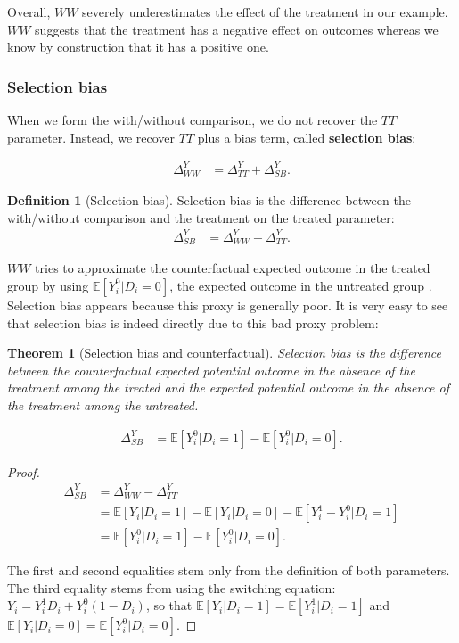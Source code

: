 \documentclass[
]{book}
\newcommand{\esp}[1]{\mathbb{E}[ #1 ]}
\newtheorem{theorem}{Theorem}[chapter]
\theoremstyle{definition}
\newtheorem{definition}{Definition}[chapter]
\theoremstyle{definition}
\theoremstyle{definition}
\theoremstyle{definition}
\theoremstyle{remark}
\begin{document}
Overall, \(WW\) severely underestimates the effect of the treatment in our example.
\(WW\) suggests that the treatment has a negative effect on outcomes whereas we know by construction that it has a positive one.

\hypertarget{selection-bias}{%
\subsubsection{Selection bias}\label{selection-bias}}

When we form the with/without comparison, we do not recover the \(TT\) parameter.
Instead, we recover \(TT\) plus a bias term, called \textbf{selection bias}:

\begin{align*}
\Delta^Y_{WW} & =\Delta^Y_{TT}+\Delta^Y_{SB}.
\end{align*}

\begin{definition}[Selection bias]
\protect\hypertarget{def:SB}{}{\label{def:SB} \iffalse (Selection bias) \fi{} }Selection bias is the difference between the with/without comparison and the treatment on the treated parameter:
\begin{align*}
\Delta^Y_{SB} & = \Delta^Y_{WW}-\Delta^Y_{TT}.
\end{align*}
\end{definition}

\(WW\) tries to approximate the counterfactual expected outcome in the treated group by using \(\esp{Y_i^0|D_i=0}\), the expected outcome in the untreated group .
Selection bias appears because this proxy is generally poor.
It is very easy to see that selection bias is indeed directly due to this bad proxy problem:

\begin{theorem}[Selection bias and counterfactual]
\protect\hypertarget{thm:SBth}{}{\label{thm:SBth} \iffalse (Selection bias and counterfactual) \fi{} }Selection bias is the difference between the counterfactual expected potential outcome in the absence of the treatment among the treated and the expected potential outcome in the absence of the treatment among the untreated.

\begin{align*}
\Delta^Y_{SB} & = \esp{Y_i^0|D_i=1}-\esp{Y_i^0|D_i=0}.
\end{align*}
\end{theorem}

\begin{proof}
\iffalse{} {Proof. } \fi{}\begin{align*}
\Delta^Y_{SB} & = \Delta^Y_{WW}-\Delta^Y_{TT} \\
              & = \esp{Y_i|D_i=1}-\esp{Y_i|D_i=0}-\esp{Y_i^1-Y_i^0|D_i=1}\\
              & = \esp{Y_i^0|D_i=1}-\esp{Y_i^0|D_i=0}.
\end{align*}

The first and second equalities stem only from the definition of both parameters.
The third equality stems from using the switching equation: \(Y_i=Y_i^1D_i+Y_i^0(1-D_i)\), so that \(\esp{Y_i|D_i=1}=\esp{Y^1_i|D_i=1}\) and \(\esp{Y_i|D_i=0}=\esp{Y_i^0|D_i=0}\).
\end{proof}
\end{document}
